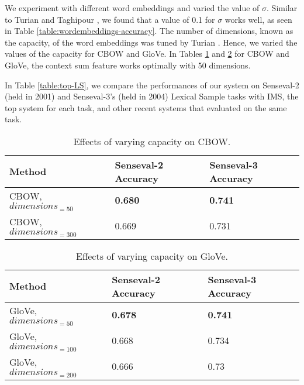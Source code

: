 We experiment with different word embeddings and varied the value of
$\sigma$. Similar to Turian 
and Taghipour , we found that a value of 0.1
for $\sigma$ works well, as seen in Table
\ref{table:wordembeddings-accuracy}. The number of dimensions, known
as the capacity, of the word embeddings was tuned by Turian
. Hence, we varied the values
of the capacity for CBOW and GloVe.  In Tables
\ref{table:wordembeddings-word2vec-accuracy} and
\ref{table:wordembeddings-glove-accuracy} for CBOW and GloVe, the
context sum feature works optimally with 50 dimensions.

In Table \ref{table:top-LS}, we compare the performances of our system
on Senseval-2 (held in 2001) and Senseval-3's (held in 2004) Lexical
Sample tasks with IMS, the top system for each task, and other recent
systems that evaluated on the same task.

\begin{table}[th]
	\caption{Effects of varying capacity on CBOW.}
	\label{table:wordembeddings-word2vec-accuracy}
	\begin{center}
		\begin{tabular}{| p{7cm} | p{4cm} | p{4cm} |}
			\hline
			Method & Senseval-2 Accuracy & Senseval-3 Accuracy \\
			\hline
			CBOW, $dimensions_{=50}$ & {\bf0.680} & {\bf0.741} \\
			\hline
			CBOW, $dimensions_{=300}$ & 0.669 & 0.731 \\
			\hline
		\end{tabular}
	\end{center}
\end{table}

\begin{table}[th]
	\caption{Effects of varying capacity on GloVe.}
	\label{table:wordembeddings-glove-accuracy}
	\begin{center}
		\begin{tabular}{| p{7cm} | p{4cm} | p{4cm} |}
			\hline
			Method & Senseval-2 Accuracy & Senseval-3 Accuracy \\
			\hline
			GloVe, $dimensions_{=50}$ & {\bf0.678} & {\bf0.741} \\
			\hline
			GloVe, $dimensions_{=100}$ & 0.668 & 0.734 \\
			\hline
			GloVe, $dimensions_{=200}$ & 0.666 & 0.73 \\
			\hline
		\end{tabular}
	\end{center}
\end{table}

